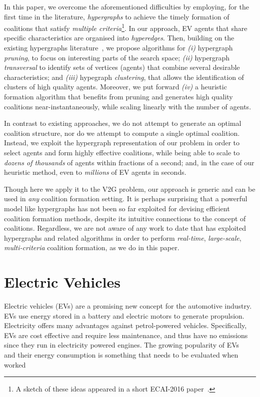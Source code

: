 In this paper, we overcome the aforementioned difficulties by employing, for the first time in the literature, {\em hypergraphs} to achieve the timely formation of coalitions that satisfy {\em multiple criteria}\footnote{A sketch of these ideas appeared in a short ECAI-2016 paper~\cite{christianos2016}.}. In our approach, EV agents that share specific characteristics are organised into {\em hyperedges}. Then, building on the existing hypergraphs 
literature~\cite{eiter1995identifying,zhou2006learning}, we propose algorithms for {\em (i)} hypergraph {\em pruning},  to focus on interesting parts of the search space; 
{\em (ii)}  hypergraph {\em transversal} to identify sets of vertices (agents) that combine several desirable characteristics; and {\em (iii)} hypegraph {\em clustering}, that allows the identification of clusters of high quality agents. Moreover, we put forward {\em (iv)}  a heuristic formation algorithm that benefits from pruning and generates high quality coalitions near-instantaneously, while scaling linearly with the number of agents.

In contrast to existing approaches, we do not attempt to generate an optimal coalition structure, nor do we attempt to compute a single optimal coalition.
Instead, we exploit the hypergraph representation of our problem in order to select agents and form highly effective coalitions, while being able to scale to {\em dozens of thousands} of agents within fractions of a second; and, in the case of our heuristic method, even to {\em millions} of EV agents in seconds.

Though here we apply it to the V2G problem, our approach is generic and can be used in {\em any} coalition formation setting.
It is perhaps surprising that a powerful model like hypergraphs has not been so far exploited for devising efficient coalition formation methods, despite its intuitive connections to the concept of coalitions. Regardless, we are not aware of any work to date that has exploited hypergraphs and related algorithms in order to perform {\em real-time}, {\em large-scale}, {\em multi-criteria} coalition formation, as we do in this paper.

\section{Electric Vehicles}

Electric vehicles (EVs) are a promising new concept for the automotive industry. EVs use energy stored in a battery and electric motors to generate propulsion. Electricity offers many advantages against petrol-powered vehicles. Specifically, EVs are cost effective and require less maintenance, and thus have no emissions since they run in electricity powered engines. The growing popularity of EVs~\cite{globalev2016} and their energy consumption is something that needs to be evaluated when worked

